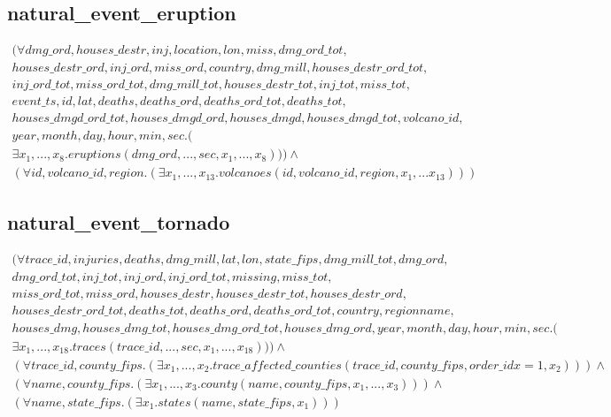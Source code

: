 \documentclass{article}
\begin{document}
\subsection{natural\_event\_eruption}
\begin{multline}
(\forall dmg\_ord,  houses\_destr,  inj,  location,  lon,  miss,  dmg\_ord\_tot,  \\ houses\_destr\_ord,  inj\_ord,  miss\_ord,  country,  dmg\_mill,  houses\_destr\_ord\_tot, \\  inj\_ord\_tot,  miss\_ord\_tot,  dmg\_mill\_tot,  houses\_destr\_tot,  inj\_tot,  miss\_tot,  \\  event\_ts,  id, lat,  deaths,  deaths\_ord,  deaths\_ord\_tot,  deaths\_tot,  \\ houses\_dmgd\_ord\_tot,  houses\_dmgd\_ord,  houses\_dmgd,  houses\_dmgd\_tot,  volcano\_id, \\  year,  month,  day,  hour,  min,  sec.(\\
\exists x_1, ..., x_{8}. eruptions(dmg\_ord, ..., sec, x_1, ..., x_{8}))) \wedge \\ 
(\forall id, volcano\_id, region.(
\exists x_1,..., x_{13}. 
volcanoes(id, volcano\_id, region, 
x_1,... x_{13})))
\end{multline} 

\subsection{natural\_event\_tornado}
\begin{multline}
(\forall trace\_id, injuries, deaths, dmg\_mill, lat, lon, state\_fips, dmg\_mill\_tot, dmg\_ord,\\  dmg\_ord\_tot, inj\_tot, inj\_ord, inj\_ord\_tot, missing, miss\_tot, \\ miss\_ord\_tot, miss\_ord, houses\_destr, houses\_destr\_tot, houses\_destr\_ord, \\ houses\_destr\_ord\_tot, deaths\_tot, deaths\_ord, deaths\_ord\_tot, country, regionname, \\ houses\_dmg, houses\_dmg\_tot, houses\_dmg\_ord\_tot, houses\_dmg\_ord, year, month, day, hour, min, sec.( \\
\exists x_1, ..., x_{18}. traces(trace\_id, ..., sec, x_1, ..., x_{18})))  \wedge \\ 
(\forall trace\_id, county\_fips.(
\exists x_1, ..., x_{2}. trace\_affected\_counties(trace\_id, county\_fips, order\_idx=1, x_{2})))
 \wedge \\ (
 \forall name, county\_fips.(
\exists x_1, ..., x_{3}. county(name, county\_fips, x_1, ..., x_{3}))
 ) \wedge \\ (
\forall name, state\_fips.(
\exists x_1. states( name, state\_fips, x_1))
 )
\end{multline} 
\end{document}
